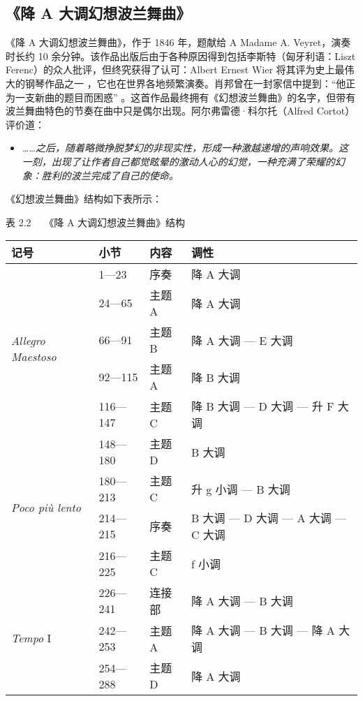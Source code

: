     \subsection{\heiti \fontsize{15}{18}\selectfont 《降 A 大调幻想波兰舞曲》}
    《降 A 大调幻想波兰舞曲》，作于 1846 年，题献给 A Madame A. Veyret，演奏时长约 10 余分钟。该作品出版后由于各种原因得到包括李斯特（匈牙利语：Liszt Ferenc）的众人批评，但终究获得了认可：Albert Ernest Wier 将其评为史上最伟大的钢琴作品之一 \cite{cwu} \cite{wier}，它也在世界各地频繁演奏。肖邦曾在一封家信中提到：“他正为一支新曲的题目而困惑” \cite{bio}。这首作品最终拥有《幻想波兰舞曲》的名字，但带有波兰舞曲特色的节奏在曲中只是偶尔出现。阿尔弗雷德·科尔托（Alfred Cortot）评价道：
    \begin{itemize}
        \item[] \textit{……之后，随着略微挣脱梦幻的非现实性，形成一种激越递增的声响效果。这一刻，出现了让作者自己都觉眩晕的激动人心的幻觉，一种充满了荣耀的幻象：胜利的波兰完成了自己的使命。} \cite{bio}
    \end{itemize}

    《幻想波兰舞曲》结构如下表所示：

    \begin{center}
    \heiti \fontsize{10.5}{12.6}\selectfont 表 2.2 \ \ 《降 A 大调幻想波兰舞曲》结构
    \end{center}
    \begin{longtable}{|l|l|l|l|}
    \hline
        记号 & 小节 & 内容 & 调性 \\ \hline
        \multirow{5}{*}{\textit{Allegro Maestoso}} & 1—23 & 序奏 & 降 A 大调 \\ 
        & 24—65 & 主题 A & 降 A 大调 \\ 
        & 66—91 & 主题 B & 降 A 大调 — E 大调 \\ 
        & 92—115 & 主题 A & 降 B 大调 \\ 
        & 116—147 & 主题 C & 降 B 大调 — D 大调 — 升 F 大调 \\ \hline
        \multirow{4}{*}{\textit{Poco più lento}} & 148—180 & 主题 D & B 大调 \\ 
        & 180—213 & 主题 C & 升 g 小调 — B 大调 \\ 
        & 214—215 & 序奏 & B 大调 — D 大调 — A 大调 — C 大调 \\ 
        & 216—225 & 主题 C & f 小调 \\ \hline
        \multirow{3}{*}{\textit{Tempo }I} & 226—241 & 连接部 & 降 A 大调 — B 大调 \\ 
        & 242—253 & 主题 A & 降 A 大调 — B 大调 — 降 A 大调 \\
        & 254—288 & 主题 D & 降 A 大调 \\ \hline
    \end{longtable}

